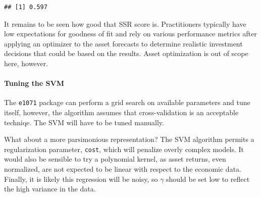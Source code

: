 \documentclass[]{article}
\newenvironment{Shaded}{\begin{snugshade}}{\end{snugshade}}
\newcommand{\KeywordTok}[1]{\textcolor[rgb]{0.13,0.29,0.53}{\textbf{#1}}}
\newcommand{\DataTypeTok}[1]{\textcolor[rgb]{0.13,0.29,0.53}{#1}}
\newcommand{\DecValTok}[1]{\textcolor[rgb]{0.00,0.00,0.81}{#1}}
\newcommand{\StringTok}[1]{\textcolor[rgb]{0.31,0.60,0.02}{#1}}
\newcommand{\CommentTok}[1]{\textcolor[rgb]{0.56,0.35,0.01}{\textit{#1}}}
\newcommand{\OperatorTok}[1]{\textcolor[rgb]{0.81,0.36,0.00}{\textbf{#1}}}
\newcommand{\NormalTok}[1]{#1}
\let\oldparagraph\paragraph
\renewcommand{\paragraph}[1]{\oldparagraph{#1}\mbox{}}
\begin{document}
\begin{verbatim}
## [1] 0.597
\end{verbatim}

It remains to be seen how good that SSR score is. Practitioners
typically have low expectations for goodness of fit and rely on various
performance metrics after applying an optimizer to the asset forecasts
to determine realistic investment decisions that could be based on the
results. Asset optimization is out of scope here, however.

\paragraph{Tuning the SVM}\label{tuning-the-svm}

The \texttt{e1071} package can perform a grid search on available
parameters and tune itself, however, the algorithm assumes that
cross-validation is an acceptable techniqe. The SVM will have to be
tuned manually.

What about a more parsimonious representation? The SVM algorithm permits
a regularization parameter, \texttt{cost}, which will penalize overly
complex models. It would also be sensible to try a polynomial kernel, as
asset returns, even normalized, are not expected to be linear with
respect to the economic data. Finally, it is likely this regression will
be noisy, so \(\gamma\) should be set low to reflect the high variance
in the data.

\begin{Shaded}
\end{Shaded}
\end{document}
